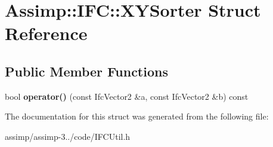 \hypertarget{struct_assimp_1_1_i_f_c_1_1_x_y_sorter}{\section{Assimp\+:\+:I\+F\+C\+:\+:X\+Y\+Sorter Struct Reference}
\label{struct_assimp_1_1_i_f_c_1_1_x_y_sorter}
}
\subsection*{Public Member Functions}
\begin{DoxyCompactItemize}
\item 
\hypertarget{struct_assimp_1_1_i_f_c_1_1_x_y_sorter_a9378070be389635bbc2a5911e5c0e4cb}{bool {\bfseries operator()} (const Ifc\+Vector2 \&a, const Ifc\+Vector2 \&b) const }\label{struct_assimp_1_1_i_f_c_1_1_x_y_sorter_a9378070be389635bbc2a5911e5c0e4cb}

\end{DoxyCompactItemize}


The documentation for this struct was generated from the following file\+:\begin{DoxyCompactItemize}
\item 
assimp/assimp-\/3../code/I\+F\+C\+Util.\+h\end{DoxyCompactItemize}
